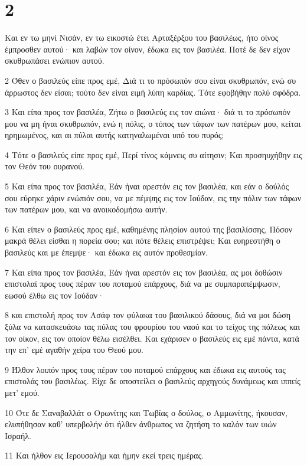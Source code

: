\chapter{2}

\par Και εν τω μηνί Νισάν, εν τω εικοστώ έτει Αρταξέρξου του βασιλέως, ήτο οίνος έμπροσθεν αυτού· και λαβών τον οίνον, έδωκα εις τον βασιλέα. Ποτέ δε δεν είχον σκυθρωπάσει ενώπιον αυτού.
\par 2 Όθεν ο βασιλεύς είπε προς εμέ, Διά τι το πρόσωπόν σου είναι σκυθρωπόν, ενώ συ άρρωστος δεν είσαι; τούτο δεν είναι ειμή λύπη καρδίας. Τότε εφοβήθην πολύ σφόδρα.
\par 3 Και είπα προς τον βασιλέα, Ζήτω ο βασιλεύς εις τον αιώνα· διά τι το πρόσωπόν μου να μη ήναι σκυθρωπόν, ενώ η πόλις, ο τόπος των τάφων των πατέρων μου, κείται ηρημωμένος, και αι πύλαι αυτής κατηναλωμέναι υπό του πυρός;
\par 4 Τότε ο βασιλεύς είπε προς εμέ, Περί τίνος κάμνεις συ αίτησιν; Και προσηυχήθην εις τον Θεόν του ουρανού.
\par 5 Και είπα προς τον βασιλέα, Εάν ήναι αρεστόν εις τον βασιλέα, και εάν ο δούλός σου εύρηκε χάριν ενώπιόν σου, να με πέμψης εις τον Ιούδαν, εις την πόλιν των τάφων των πατέρων μου, και να ανοικοδομήσω αυτήν.
\par 6 Και είπεν ο βασιλεύς προς εμέ, καθημένης πλησίον αυτού της βασιλίσσης, Πόσον μακρά θέλει είσθαι η πορεία σου; και πότε θέλεις επιστρέψει; Και ευηρεστήθη ο βασιλεύς και με έπεμψε· και έδωκα εις αυτόν προθεσμίαν.
\par 7 Και είπα προς τον βασιλέα, Εάν ήναι αρεστόν εις τον βασιλέα, ας μοι δοθώσιν επιστολαί προς τους πέραν του ποταμού επάρχους, διά να με συμπαραπέμψωσιν, εωσού έλθω εις τον Ιούδαν·
\par 8 και επιστολή προς τον Ασάφ τον φύλακα του βασιλικού δάσους, διά να μοι δώση ξύλα να κατασκευάσω τας πύλας του φρουρίου του ναού και το τείχος της πόλεως και τον οίκον, εις τον οποίον θέλω εισέλθει. Και εχάρισεν ο βασιλεύς εις εμέ πάντα, κατά την επ' εμέ αγαθήν χείρα του Θεού μου.
\par 9 Ήλθον λοιπόν προς τους πέραν του ποταμού επάρχους και έδωκα εις αυτούς τας επιστολάς του βασιλέως. Είχε δε αποστείλει ο βασιλεύς αρχηγούς δυνάμεως και ιππείς μετ' εμού.
\par 10 Ότε δε Σαναβαλλάτ ο Ορωνίτης και Τωβίας ο δούλος, ο Αμμωνίτης, ήκουσαν, ελυπήθησαν καθ' υπερβολήν ότι ήλθεν άνθρωπος να ζητήση το καλόν των υιών Ισραήλ.
\par 11 Και ήλθον εις Ιερουσαλήμ και ήμην εκεί τρεις ημέρας.
